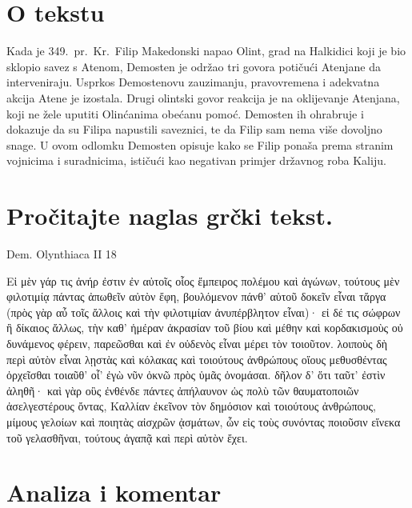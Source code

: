 \section*{O tekstu}

Kada je 349.\ pr.~Kr.\ Filip Makedonski napao Olint, grad na Halkidici koji je bio sklopio savez s Atenom, Demosten je održao tri govora potičući Atenjane da interveniraju. Usprkos Demostenovu zauzimanju, pravovremena i adekvatna akcija Atene je izostala. Drugi olintski govor reakcija je na oklijevanje Atenjana, koji ne žele uputiti Olinćanima obećanu pomoć. Demosten ih ohrabruje i dokazuje da su Filipa napustili saveznici, te da Filip sam nema više dovoljno snage. U ovom odlomku Demosten opisuje kako se Filip ponaša prema stranim vojnicima i suradnicima, ističući kao negativan primjer državnog roba Kaliju.


\section*{Pročitajte naglas grčki tekst.}
Dem. Olynthiaca II 18

\medskip

{\large
\begin{greek}
\noindent Εἰ μὲν γάρ τις ἀνήρ ἐστιν ἐν αὐτοῖς οἷος ἔμπειρος πολέμου καὶ ἀγώνων, τούτους μὲν φιλοτιμίᾳ πάντας ἀπωθεῖν αὐτὸν ἔφη, βουλόμενον πάνθ' αὑτοῦ δοκεῖν εἶναι τἄργα (πρὸς γὰρ αὖ τοῖς ἄλλοις καὶ  τὴν φιλοτιμίαν ἀνυπέρβλητον εἶναι)· εἰ δέ τις σώφρων ἢ δίκαιος ἄλλως, τὴν καθ' ἡμέραν ἀκρασίαν τοῦ βίου καὶ μέθην καὶ κορδακισμοὺς οὐ δυνάμενος φέρειν, παρεῶσθαι καὶ ἐν οὐδενὸς εἶναι μέρει τὸν τοιοῦτον. λοιποὺς δὴ περὶ αὐτὸν εἶναι λῃστὰς καὶ κόλακας καὶ τοιούτους ἀνθρώπους οἵους μεθυσθέντας ὀρχεῖσθαι τοιαῦθ' οἷ' ἐγὼ νῦν ὀκνῶ πρὸς ὑμᾶς ὀνομάσαι. δῆλον δ' ὅτι ταῦτ' ἐστὶν ἀληθῆ· καὶ γὰρ οὓς ἐνθένδε πάντες ἀπήλαυνον ὡς πολὺ τῶν θαυματοποιῶν ἀσελγεστέρους ὄντας, Καλλίαν ἐκεῖνον τὸν δημόσιον καὶ τοιούτους ἀνθρώπους, μίμους γελοίων καὶ ποιητὰς αἰσχρῶν ᾀσμάτων, ὧν εἰς τοὺς συνόντας ποιοῦσιν εἵνεκα τοῦ γελασθῆναι, τούτους ἀγαπᾷ καὶ περὶ αὑτὸν ἔχει.

\end{greek}

}

\section*{Analiza i komentar}



